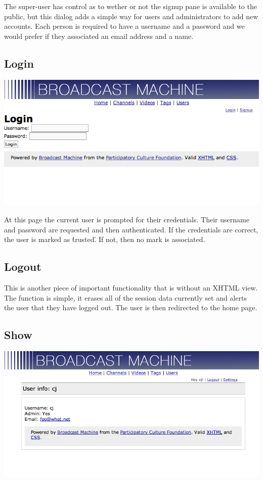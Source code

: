 \documentclass[a4paper,12pt]{report}
\begin{document}
The super-user has control as to wether or not the signup pane is available to the public, but this dialog adds a simple way for users and administrators to add new accounts.
Each person is required to have a username and a password and we would prefer if they associated an email address and a name.

\subsection{Login}
\includegraphics[width=150mm]{images/userlogin.png}

At this page the current user is prompted for their credentials.
Their username and password are requested and then authenticated.
If the credentials are correct, the user is marked as \'trusted\'.
If not, then no mark is associated.

\subsection{Logout}
This is another piece of important functionality that is without an XHTML view.
The function is simple, it erases all of the session data currently set and alerts the user that they have logged out.
The user is then redirected to the home page.

\subsection{Show}
\includegraphics[width=150mm]{images/usershow.png}
\end{document}
